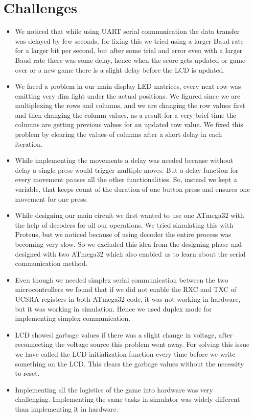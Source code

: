 \documentclass[12pt]{article}
\begin{document}
\section{Challenges}
    \begin{itemize}[leftmargin=*]
        \item We noticed that while using UART serial communication the data transfer was delayed by few seconds, for fixing this we tried using a larger Baud rate for a larger bit per second, but after some trial and error even with a larger Baud rate there was some delay, hence when the score gets updated or game over or a new game there is a slight delay before the LCD is updated.

        \item We faced a problem in our main display LED matrices, every next row was emitting very dim light under the actual positions. We figured since we are multiplexing the rows and columns, and we are changing the row values first and then changing the column values, as a result for a very brief time the columns are getting previous values for an updated row value. We fixed this problem by clearing the values of columns after a short delay in each iteration.

        \item While implementing the movements a delay was needed because without delay a single press would trigger multiple moves. But a delay function for every movement pauses all the other functionalities. So, instead we kept a variable, that keeps count of the duration of one button press and ensures one movement for one press.

        \item While designing our main circuit we first wanted to use one ATmega32 with the help of decoders for all our operations. We tried simulating this with Proteus, but we noticed because of using decoder the entire process was becoming very slow. So we excluded this idea from the designing phase and designed with two ATmega32 which also enabled us to learn about the serial communication method.

        \item Even though we needed simplex serial communication between the two microcontrollers we found that if we did not enable the RXC and TXC of UCSRA registers in both ATmega32 code, it was not working in hardware, but it was working in simulation. Hence we used duplex mode for implementing simplex communication.

        \item LCD showed garbage values if there was a slight change in voltage, after reconnecting the voltage source this problem went away. For solving this issue we have called the LCD initialization function every time before we write something on the LCD. This clears the garbage values without the necessity to reset.

        \item Implementing all the logistics of the game into hardware was very challenging. Implementing the same tasks in simulator was widely different than implementing it in hardware.
    \end{itemize}
\end{document}
